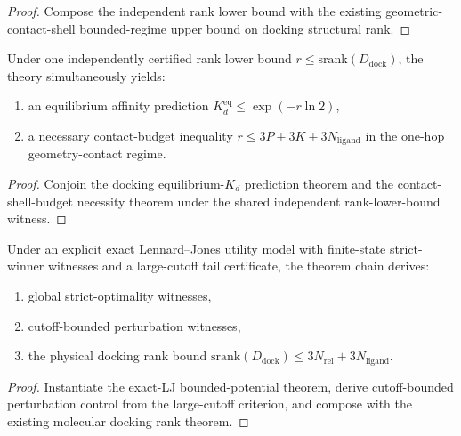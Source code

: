 \begin{proof}
Compose the independent rank lower bound with the existing geometric-contact-shell bounded-regime upper bound on docking structural rank.
\end{proof}

\begin{theorem}\label{thm:md-independent-rank-risky-prediction-bundle}
Under one independently certified rank lower bound $r \le \mathrm{srank}(D_{\mathrm{dock}})$, the theory simultaneously yields:
\begin{enumerate}
\item an equilibrium affinity prediction
\(
K_d^{\mathrm{eq}} \le \exp(-r\ln 2)
\),
\item a necessary contact-budget inequality
\(
r \le 3P + 3K + 3N_{\mathrm{ligand}}
\)
in the one-hop geometry-contact regime.
\end{enumerate}
\end{theorem}

\begin{proof}
Conjoin the docking equilibrium-$K_d$ prediction theorem and the contact-shell-budget necessity theorem under the shared independent rank-lower-bound witness.
\end{proof}

\begin{theorem}\label{thm:md-exact-lj-physics-witness-bundle}
Under an explicit exact Lennard--Jones utility model with finite-state strict-winner witnesses and a large-cutoff tail certificate, the theorem chain derives:
\begin{enumerate}
\item global strict-optimality witnesses,
\item cutoff-bounded perturbation witnesses,
\item the physical docking rank bound
\(\mathrm{srank}(D_{\mathrm{dock}}) \le 3N_{\mathrm{rel}} + 3N_{\mathrm{ligand}}\).
\end{enumerate}
\end{theorem}

\begin{proof}
Instantiate the exact-LJ bounded-potential theorem, derive cutoff-bounded perturbation control from the large-cutoff criterion, and compose with the existing molecular docking rank theorem.
\end{proof}

